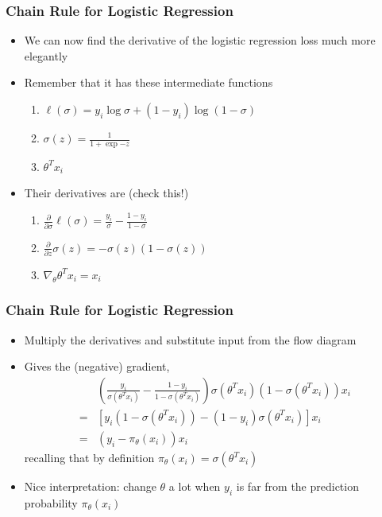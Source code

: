 \documentclass[10pt,mathserif]{beamer}
\begin{document}
\begin{frame}
  \frametitle{Chain Rule for Logistic Regression}
  \begin{itemize}
  \item We can now find the derivative of the logistic regression loss much more
    elegantly
  \item Remember that it has these intermediate functions
    \begin{enumerate}
    \item $\ell\left(\sigma\right) = y_i\log\sigma + \left(1 - y_i\right)\log\left(1 - \sigma\right)$
    \item $\sigma\left(z\right) = \frac{1}{1 + \exp{-z}}$
    \item $\theta^{T}x_i$
    \end{enumerate}
  \item Their derivatives are (check this!)
    \begin{enumerate}
    \item $\frac{\partial}{\partial \sigma}\ell\left(\sigma\right) = \frac{y_i}{\sigma} - \frac{1 - y_i}{1 - \sigma}$
    \item $\frac{\partial}{\partial z}\sigma\left(z\right) = -\sigma\left(z\right)\left(1 - \sigma\left(z\right)\right)$
    \item $\nabla_{\theta} \theta^{T} x_i = x_i$
    \end{enumerate}
  \end{itemize}
\end{frame}

\begin{frame}
  \frametitle{Chain Rule for Logistic Regression}
  \begin{itemize}
  \item Multiply the derivatives and substitute input from the flow diagram
  \item Gives the (negative) gradient,
    \begin{align*}
      &\left(\frac{y_i}{\sigma\left(\theta^{T}x_i\right)} - \frac{1 - y_i}{1 - \sigma\left(\theta^{T}x_i\right)}\right)\sigma\left(\theta^{T}x_i\right)\left(1 - \sigma\left(\theta^{T}x_i\right)\right)x_i \\
      = &\left[y_i\left(1 - \sigma\left(\theta^{T} x_i\right)\right) - \left(1 - y_i\right)\sigma\left(\theta^T x_i\right)\right]x_i \\
      = &\left(y_i - \pi_{\theta}\left(x_i\right)\right) x_i
    \end{align*}
    recalling that by definition $\pi_{\theta}\left(x_i\right) =
    \sigma\left(\theta^T x_i\right)$
  \item Nice interpretation: change $\theta$ a lot when $y_i$ is far from the
    prediction probability $\pi_{\theta}\left(x_i\right)$
  \end{itemize}
\end{frame}
\end{document}
